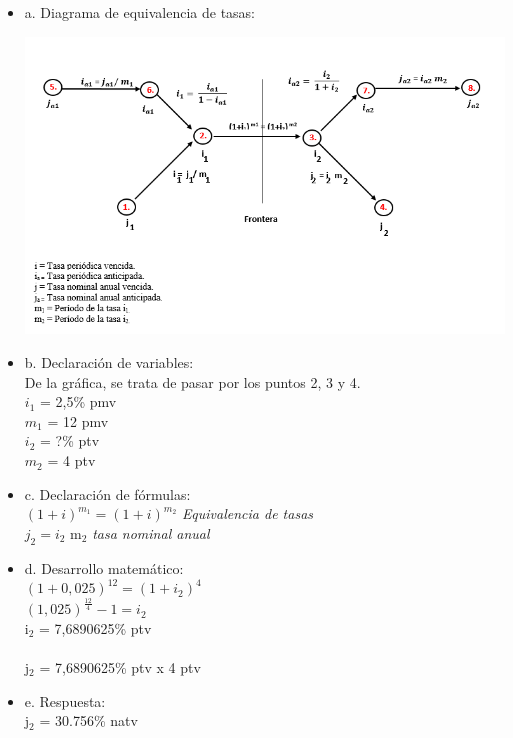 \begin{itemize}
	\item a. Diagrama de equivalencia de tasas:\\
	
	\begin{center}
	\includegraphics[height = 9.0 cm]{general}\\		
	\end{center}
	
	\item b. Declaración de variables:\\
	
	De la gráfica, se trata de pasar por los puntos 2, 3 y 4.\\
	
	$i_{1}$ = 2,5\% pmv\\
	$m_{1}$ = 12 pmv\\
	$i_{2}$ = ?\% ptv\\
	$m_{2}$ = 4 ptv\\
	
	
	\item c. Declaración de fórmulas:\\
	
	$(1+i)^{m_1} = (1+i)^{m_2}$ \hspace{35 pt} \textit{Equivalencia de tasas}\\
	$j_{2} = i_{2}$  m$_{2}$\hspace{35 pt} \textit{tasa nominal anual}\\
	
	\item d. Desarrollo matemático:\\
	$(1+0,025)^{12} = (1+i_{2})^{4}$\\
	$(1,025)^{\frac{12}{4}}-1 = i_{2}$ \\
	i$_{2}$ = 7,6890625\% ptv\\
	\\
	j$_{2}$ = 7,6890625\% ptv x 4 ptv \\
	
	\item e. Respuesta:\\
	
	j$_{2}$ = 30.756\% natv\\
\end{itemize}

